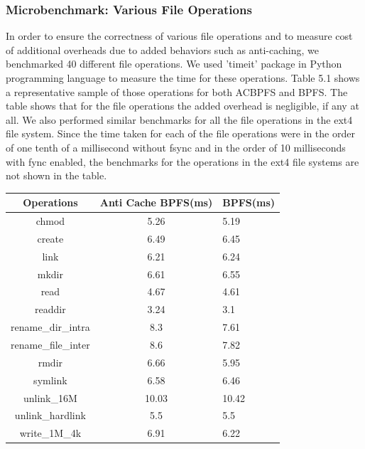 \subsubsection{Microbenchmark: Various File Operations}
In order to ensure the correctness of various file operations and to measure cost of additional overheads due to added behaviors such as anti-caching, we benchmarked 40 different file operations. We used 'timeit' package in Python programming language to measure the time for these operations. Table 5.1 shows a representative sample of those operations for both AC\-BPFS and BPFS. The table shows that for the file operations the added overhead is negligible, if any at all. We also performed similar benchmarks for all the file operations in the ext4 file system. Since the time taken for each of the file operations were in the order of one tenth of a millisecond without fsync and in the order of 10 milliseconds with fync enabled, the benchmarks for the operations in the ext4 file systems are not shown in the table.

\begin{table}[!t]
\begin{center}
{\footnotesize
\begin{tabular}{c|c|l}
\textbf{Operations} & \textbf{Anti Cache BPFS(ms)} & \textbf{BPFS(ms)} \\
\hline
chmod&5.26&5.19 \\
create&6.49&6.45 \\
link&6.21&6.24 \\
mkdir&6.61&6.55 \\
read&4.67&4.61 \\
readdir&3.24&3.1 \\
rename\_dir\_intra&8.3&7.61 \\
rename\_file\_inter&8.6&7.82 \\
rmdir&6.66&5.95 \\
symlink&6.58&6.46 \\
unlink\_16M&10.03&10.42 \\
unlink\_hardlink&5.5&5.5 \\
write\_1M\_4k&6.91&6.22 \\

\end{tabular}
}
\end{center}
\vspace{-0.1in}
\end{table}


